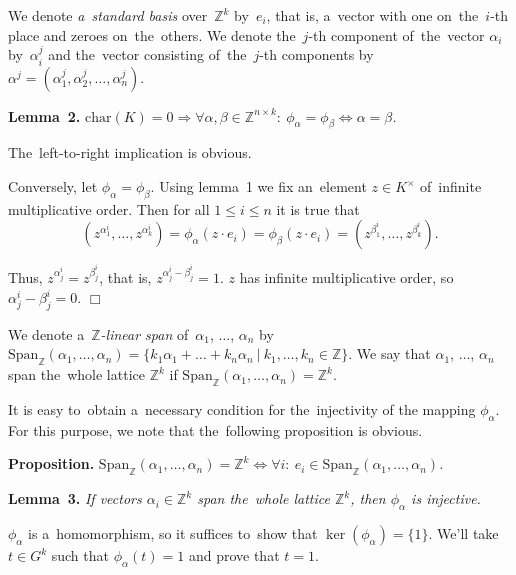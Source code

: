 \documentclass[twoside]{article}
\begin{document}
We denote \textit{a~standard basis} over~$\mathbb{Z}^k$ by~$e_i$, that is, a~vector with one on~the~$i$-th place
and zeroes on~the~others. We denote the~$j$-th component of~the~vector $\alpha_i$ by~$\alpha_i^j$
and the~vector consisting of~the~$j$-th components by~$\alpha^j = (\alpha_1^j, \alpha_2^j, \ldots, \alpha_n^j)$.

\medskip\noindent\textbf{Lemma~2.}\emph{
    $
        \mathrm{char}(K) = 0 \Rightarrow \forall \alpha, \beta \in \mathbb{Z}^{n \times k}{:} \ \phi_\alpha = \phi_\beta \Leftrightarrow \alpha = \beta
    $.
}\medskip

    The~left-to-right implication is obvious.

    Conversely, let $\phi_\alpha = \phi_\beta$. Using lemma~1 we fix an~element $z \in K^\times$
    of~infinite multiplicative order. Then for all $1 \leq i \leq n$ it is true that
    $$
        (z^{\alpha_1^i}, \ldots, z^{\alpha_k^i}) = \phi_\alpha(z \cdot e_i) = \phi_\beta(z \cdot e_i) = (z^{\beta_1^i}, \ldots, z^{\beta_k^i}).
    $$

    Thus, $z^{\alpha_j^i} = z^{\beta_j^i}$, that is, $z^{\alpha_j^i - \beta_j^i} = 1$.
    $z$ has infinite multiplicative order, so $\alpha_j^i - \beta_j^i = 0$.
\hfill$\Box$\medskip

We denote a~\textit{$\mathbb{Z}$-linear span} of~$\alpha_1$, $\ldots$, $\alpha_n$
by~$\mathrm{Span}_\mathbb{Z}(\alpha_1, \ldots, \alpha_n) = \{ k_1 \alpha_1 + \ldots + k_n \alpha_n \ | \ k_1,\allowbreak \ldots,\allowbreak k_n \in \mathbb{Z} \}$.
We say that $\alpha_1$, $\ldots$, $\alpha_n$ span the~whole lattice $\mathbb{Z}^k$ if
$\mathrm{Span}_\mathbb{Z}(\alpha_1, \ldots, \alpha_n) = \mathbb{Z}^k$.

It is easy to~obtain a~necessary condition for the~injectivity of the mapping $\phi_\alpha$. For this purpose,
we note that the~following proposition is obvious.

\medskip\noindent\textbf{Proposition.}\emph{
    $\mathrm{Span}_\mathbb{Z}(\alpha_1, \ldots, \alpha_n) = \mathbb{Z}^k \Leftrightarrow \forall i{:}\ e_i \in \mathrm{Span}_\mathbb{Z}(\alpha_1, \ldots, \alpha_n)$.
}

\medskip\noindent\textbf{Lemma~3.}\emph{
    If vectors $\alpha_i \in \mathbb{Z}^k$ span the~whole lattice $\mathbb{Z}^k$, then $\phi_\alpha$ is injective.
}\medskip

    $\phi_\alpha$ is a~homomorphism, so it suffices to~show that $\ker(\phi_\alpha) = \{1\}$.
    We'll take $t \in G^k$ such that $\phi_\alpha(t) = 1$ and prove that $t = 1$.
\end{document}
